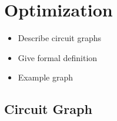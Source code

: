 \section{Optimization}
\begin{itemize}
    \item Describe circuit graphs
    \item Give formal definition
    \item Example graph
\end{itemize}

\subsection{Circuit Graph}
\label{sec:concept_circuitGraph}